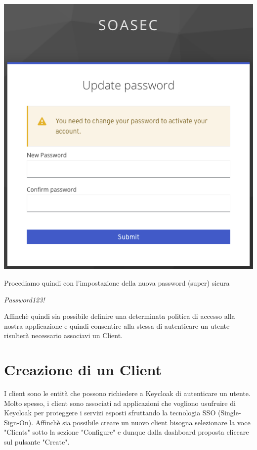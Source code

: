 \documentclass[twoside]{report}
\begin{document}
\begin{center}
\begin{minipage}{0.6\linewidth}
    \vspace{2mm}
    \centering
    \includegraphics[width= \linewidth]{11.png}
    \vspace{2mm}
\end{minipage}

\end{center}
Procediamo quindi con l'impostazione della nuova password (super) sicura

\begin{center}
\textit{Password123!}
\end{center}

Affinchè quindi sia possibile definire una determinata politica di accesso alla nostra applicazione e quindi consentire alla stessa di autenticare un utente risulterà necessario associavi un Client.

\section{Creazione di un Client}

I client sono le entità che possono richiedere a Keycloak di autenticare un utente. Molto spesso, i client sono associati ad applicazioni che vogliono usufruire di Keycloak per proteggere i servizi esposti sfruttando la tecnologia SSO (Single-Sign-On).
\bigbreak
Affinchè sia possibile creare un nuovo client bisogna selezionare la voce "Clients" sotto la sezione "Configure" e dunque dalla dashboard proposta cliccare sul pulsante "Create".
\end{document}
